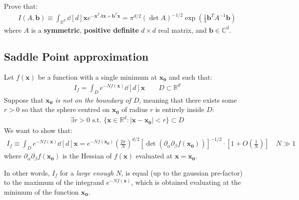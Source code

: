 \documentclass[../../main.tex]{subfiles}
\begin{document}
\begin{exo}[Generalization]
    Prove that:
    \begin{align}\label{eqn:generalized-gauss-int}
        I(A,\bm{b}) \equiv \int_{\mathbb{R}^d} \dd[d]{\bm{x}} e^{-\bm{x}^T A \bm{x} + \bm{b}^T \bm{x}} = \pi^{d/2} (\operatorname{det}A)^{-1/2} \exp\left(\frac{1}{4} \bm{b}^T A^{-1} \bm{b} \right)
    \end{align}
    where $A$ is a \textbf{symmetric}, \textbf{positive definite} $d\times d$ real matrix, and $\bm{b} \in \mathbb{C}^d$.  
\end{exo}

\subsection{Saddle Point approximation}
Let $f(\bm{x})$ be a function with a single minimum at $\bm{x_0}$ and such that:
\begin{align}\label{eqn:If-def}
    I_f = \int_{D} e^{-N f(\bm{x})} \dd[d]{\bm{x}} \qquad D \subset \mathbb{R}^d
\end{align}
Suppose that $\bm{x_0}$ \textit{is not on the boundary of $D$}, meaning that there exists some $r > 0$ so that the sphere centred on $\bm{x_0}$ of radius $r$ is entirely inside $D$:
\begin{align*}
    \exists r > 0 \text{ s.t. }\{\bm{x} \in \mathbb{R}^d \colon |\bm{x}-\bm{x_0}| < r\} \subset D
\end{align*} 
We want to show that:
\begin{align}\label{eqn:saddle-point}
    I_f \equiv \int_D e^{-N f(\bm{x})} \dd[d]{\bm{x}} = e^{-N f(\bm{x_0})} \left(\frac{2\pi}{N} \right)^{d/2} [\operatorname{det}(\partial_\alpha\partial_\beta f(\bm{x_0})) ]^{-1/2} \cdot \left[1+O\left(\frac{1}{N} \right)\right] \quad N \gg 1
\end{align}
where $\partial_\alpha \partial_\beta f(\bm{x_0})$ is the Hessian of $f(\bm{x})$ evaluated at $\bm{x} = \bm{x_0}$.

In other words, $I_f$ for a \textit{large enough} $N$, is equal (up to the gaussian pre-factor) to the maximum of the integrand  $e^{-N f(\bm{x})}$, which is obtained evaluating at the minimum of the function $\bm{x_0}$.

\medskip
\end{document}
